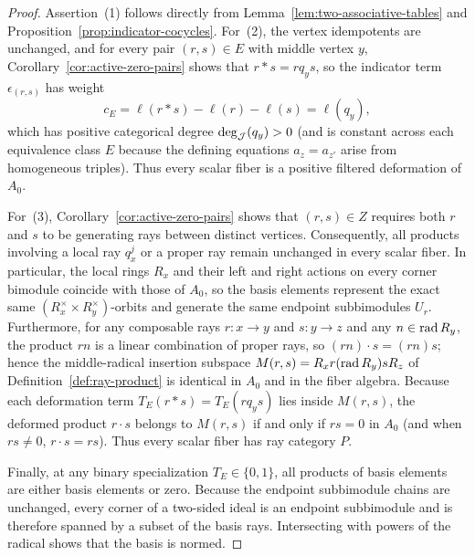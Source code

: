 \begin{proof}
Assertion~(1) follows directly from Lemma~\ref{lem:two-associative-tables} and Proposition~\ref{prop:indicator-cocycles}. For~(2), the vertex idempotents are unchanged, and for every pair $(r,s)\in E$ with middle vertex $y$, Corollary~\ref{cor:active-zero-pairs} shows that $r*s=rq_ys$, so the indicator term $\epsilon_{(r,s)}$ has weight
\[
  c_E=\ell(r*s)-\ell(r)-\ell(s)=\ell(q_y),
\]
which has positive categorical degree $\deg_\mathcal J(q_y)>0$ (and is constant across each equivalence class $E$ because the defining equations $a_z=a_{z'}$ arise from homogeneous triples). Thus every scalar fiber is a positive filtered deformation of $A_0$.

For~(3), Corollary~\ref{cor:active-zero-pairs} shows that $(r,s)\in Z$ requires both $r$ and $s$ to be generating rays between distinct vertices. Consequently, all products involving a local ray $q_x^j$ or a proper ray remain unchanged in every scalar fiber. In particular, the local rings $R_x$ and their left and right actions on every corner bimodule coincide with those of $A_0$, so the basis elements represent the exact same $(R_x^\times\times R_y^\times)$-orbits and generate the same endpoint subbimodules $U_r$. Furthermore, for any composable rays $r\colon x\to y$ and $s\colon y\to z$ and any $n\in\operatorname{rad} R_y$, the product $rn$ is a linear combination of proper rays, so $(rn)\cdot s=(rn)s$; hence the middle-radical insertion subspace $M(r,s)=R_xr(\operatorname{rad} R_y)sR_z$ of Definition~\ref{def:ray-product} is identical in $A_0$ and in the fiber algebra. Because each deformation term $T_E(r*s)=T_E(rq_ys)$ lies inside $M(r,s)$, the deformed product $r\cdot s$ belongs to $M(r,s)$ if and only if $rs=0$ in $A_0$ (and when $rs\ne0$, $r\cdot s=rs$). Thus every scalar fiber has ray category $P$.

Finally, at any binary specialization $T_E\in\{0,1\}$, all products of basis elements are either basis elements or zero. Because the endpoint subbimodule chains are unchanged, every corner of a two-sided ideal is an endpoint subbimodule and is therefore spanned by a subset of the basis rays. Intersecting with powers of the radical shows that the basis is normed.
\end{proof}

